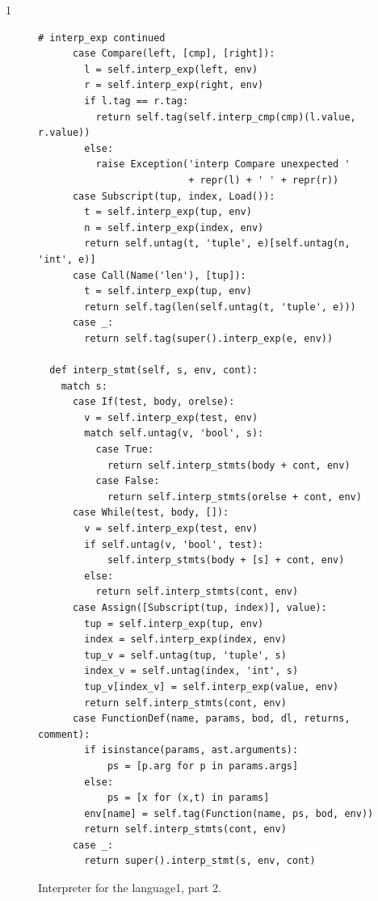 \documentclass[7x10]{TimesAPriori_MIT}%
\def\pythonEd{1}
\providecommand{\BookEdition}{1}
\let\edition\BookEdition
\newcommand{\pythonColor}[0]{}
\newcommand{\python}[1]{{\if\edition\pythonEd\pythonColor #1\fi}}
\numberwithin{theorem}{chapter}
\numberwithin{definition}{chapter}
\numberwithin{equation}{chapter}
\begin{document}
{\if\edition\pythonEd\pythonColor
  \begin{figure}[tbp]
\begin{tcolorbox}[colback=white]    
\begin{lstlisting}[basicstyle=\ttfamily\footnotesize]
  # interp_exp continued    
      case Compare(left, [cmp], [right]):
        l = self.interp_exp(left, env)
        r = self.interp_exp(right, env)
        if l.tag == r.tag:
          return self.tag(self.interp_cmp(cmp)(l.value, r.value))
        else:
          raise Exception('interp Compare unexpected '
                          + repr(l) + ' ' + repr(r))
      case Subscript(tup, index, Load()):
        t = self.interp_exp(tup, env)
        n = self.interp_exp(index, env)
        return self.untag(t, 'tuple', e)[self.untag(n, 'int', e)]
      case Call(Name('len'), [tup]):
        t = self.interp_exp(tup, env)
        return self.tag(len(self.untag(t, 'tuple', e)))
      case _:
        return self.tag(super().interp_exp(e, env))

  def interp_stmt(self, s, env, cont):
    match s:
      case If(test, body, orelse):
        v = self.interp_exp(test, env)
        match self.untag(v, 'bool', s):
          case True:
            return self.interp_stmts(body + cont, env)
          case False:
            return self.interp_stmts(orelse + cont, env)
      case While(test, body, []):
        v = self.interp_exp(test, env)
        if self.untag(v, 'bool', test):
            self.interp_stmts(body + [s] + cont, env)
        else:
          return self.interp_stmts(cont, env)
      case Assign([Subscript(tup, index)], value):
        tup = self.interp_exp(tup, env)
        index = self.interp_exp(index, env)
        tup_v = self.untag(tup, 'tuple', s)
        index_v = self.untag(index, 'int', s)
        tup_v[index_v] = self.interp_exp(value, env)
        return self.interp_stmts(cont, env)
      case FunctionDef(name, params, bod, dl, returns, comment):
        if isinstance(params, ast.arguments):
            ps = [p.arg for p in params.args]
        else:
            ps = [x for (x,t) in params]
        env[name] = self.tag(Function(name, ps, bod, env))
        return self.interp_stmts(cont, env)
      case _:
        return super().interp_stmt(s, env, cont)
\end{lstlisting}
\end{tcolorbox}

\caption{Interpreter for the \LangDyn{} language\python{, part 2}.}
\label{fig:interp-Ldyn-2}
\end{figure}
\fi}
\end{document}
